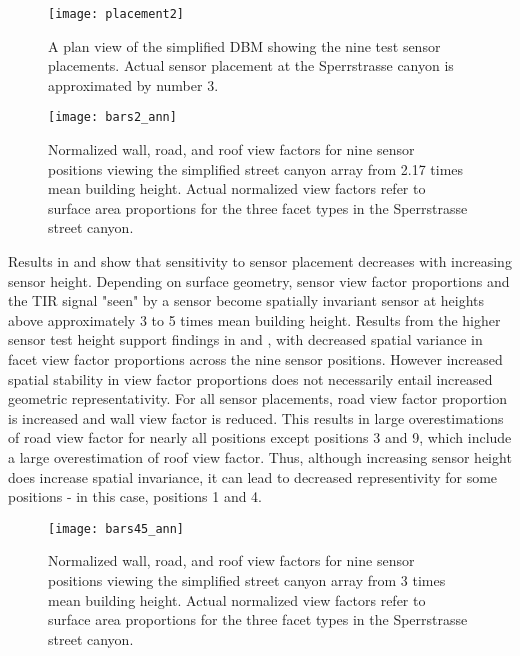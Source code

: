 \begin{bibunit}
 \begin{figure}[H]
	\centering
	\texttt{[image: placement2]}
	\caption{A plan view of the simplified DBM showing the nine test sensor placements. Actual sensor placement at the Sperrstrasse canyon is approximated by number 3.}
	\label{placement}
\end{figure}

 \begin{figure}[H]
	\centering
	\texttt{[image: bars2\_ann]}
	\caption{Normalized wall, road, and roof view factors for nine sensor positions viewing the simplified street canyon array from 2.17 times mean building height. Actual normalized view factors refer to surface area proportions for the three facet types in the Sperrstrasse street canyon. }
	\label{bars1}
 \end{figure}

Results in \citet{Adderley2015} and \citet{Roberts2010} show that sensitivity to sensor placement decreases with increasing sensor height. Depending on surface geometry, sensor view factor proportions and the TIR signal "seen" by a sensor become spatially invariant sensor at heights above approximately 3 to 5 times mean building height. Results from the higher sensor test height support findings in \citet{Adderley2015} and \citet{Roberts2010}, with decreased spatial variance in facet view factor proportions across the nine sensor positions. However increased spatial stability in view factor proportions does not necessarily entail increased geometric representativity. For all sensor placements, road view factor proportion is increased and wall view factor is reduced. This results in large overestimations of road view factor for nearly all positions except positions 3 and 9, which include a large overestimation of roof view factor. Thus, although increasing sensor height does increase spatial invariance, it can lead to decreased representivity for some positions - in this case, positions 1 and 4.

\begin{figure}[H]
	\centering
	\texttt{[image: bars45\_ann]}
	\caption{Normalized wall, road, and roof view factors for nine sensor positions viewing the simplified street canyon array from 3 times mean building height. Actual normalized view factors refer to surface area proportions for the three facet types in the Sperrstrasse street canyon. }
	\label{bars45}
\end{figure}


\end{bibunit}
